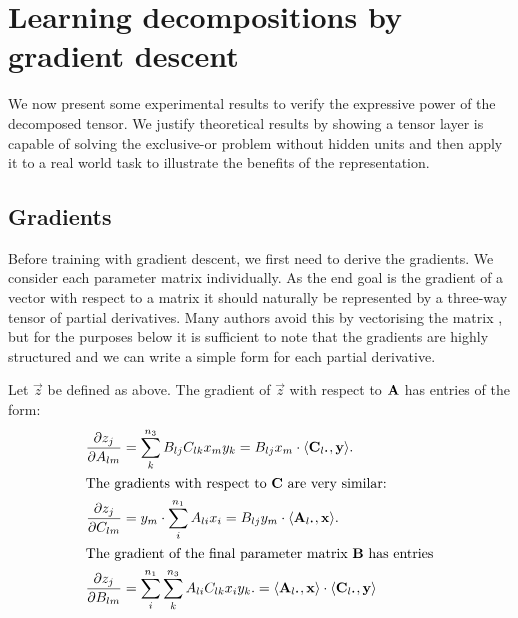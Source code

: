 \section{Learning decompositions by gradient descent}
We now present some experimental results 
to verify the expressive power of the decomposed tensor. We justify theoretical
results by showing a tensor layer is capable of solving the exclusive-or problem without hidden units
and then apply it to a real world task to illustrate the benefits of the representation.

\subsection{Gradients}
Before training with gradient descent, we first need to derive the gradients. 
We consider each parameter matrix individually.
As the end goal is the gradient of a vector with respect
to a matrix it should naturally be represented by a three-way tensor of partial derivatives.
Many authors avoid this by
vectorising the matrix \autocite{Magnus2007}, but for the purposes below it is sufficient to note
that the gradients are highly structured and we can write a simple form for each partial derivative.

Let \(\vec{z}\) be defined as above.
The gradient of \(\vec{z}\) with respect to \(\mathbf{A}\) has entries of the form:
\begin{align}
	\frac{\partial z_j}{\partial A_{lm}} &= \sum_k^{n_3}B_{lj}C_{lk}x_my_k 
		= B_{lj}x_m \cdot \langle\vec{C}_{l\midbullet}, \vec{y}\rangle.\\
\intertext{The gradients with respect to \(\mat{C}\) are very similar:}
	\frac{\partial z_j}{\partial C_{lm}} &= y_m \cdot \sum_i^{n_1}A_{li}x_i 
		= B_{lj}y_m \cdot \langle\vec{A}_{l\midbullet}, \vec{x}\rangle.\\
\intertext{The gradient of the final parameter matrix \(\mat{B}\) has entries}
	\frac{\partial z_j}{\partial B_{lm}} &= 
		\sum_i^{n_1}\sum_k^{n_3}A_{li}C_{lk}x_iy_k. 
		= \langle\vec{A}_{l\midbullet}, \vec{x}\rangle \cdot 
		\langle\vec{C}_{l\midbullet}, \vec{y}\rangle
		\label{eq:cpbilingrad}
\end{align}


